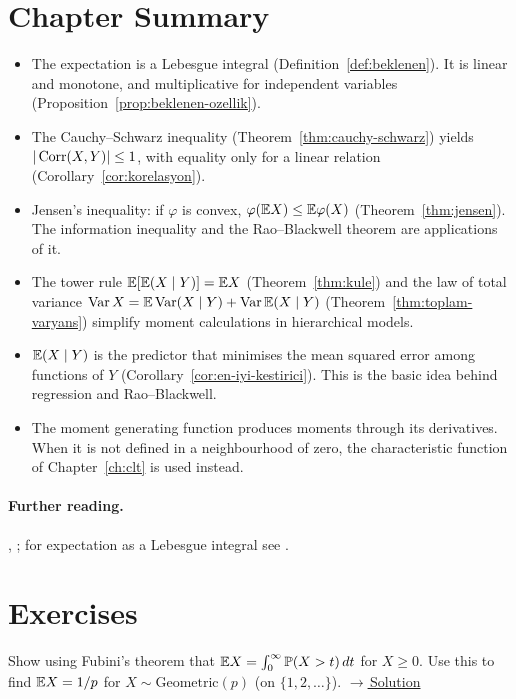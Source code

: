 \documentclass[main.tex]{subfiles}
\begin{document}
\section{Chapter Summary}
\begin{summary}
\begin{itemize}
  \item The expectation is a Lebesgue integral (Definition~\ref{def:beklenen}). It is linear and monotone, and multiplicative for independent variables (Proposition~\ref{prop:beklenen-ozellik}).
  \item The Cauchy--Schwarz inequality (Theorem~\ref{thm:cauchy-schwarz}) yields $|\operatorname{Corr}(X,Y)|\le1$, with equality only for a linear relation (Corollary~\ref{cor:korelasyon}).
  \item Jensen's inequality: if $\varphi$ is convex, $\varphi(\mathbb{E} X)\le\mathbb{E}\varphi(X)$ (Theorem~\ref{thm:jensen}). The information inequality and the Rao--Blackwell theorem are applications of it.
  \item The tower rule $\mathbb{E}[\mathbb{E}(X\mid Y)]=\mathbb{E} X$ (Theorem~\ref{thm:kule}) and the law of total variance $\operatorname{Var} X=\mathbb{E}\operatorname{Var}(X\mid Y)+\operatorname{Var}\mathbb{E}(X\mid Y)$ (Theorem~\ref{thm:toplam-varyans}) simplify moment calculations in hierarchical models.
  \item $\mathbb{E}(X\mid Y)$ is the predictor that minimises the mean squared error among functions of $Y$ (Corollary~\ref{cor:en-iyi-kestirici}). This is the basic idea behind regression and Rao--Blackwell.
  \item The moment generating function produces moments through its derivatives. When it is not defined in a neighbourhood of zero, the characteristic function of Chapter~\ref{ch:clt} is used instead.
\end{itemize}
\end{summary}

\paragraph{Further reading.} \cite[Chapter~2]{casella}, \cite[Chapter~3]{wasserman}; for expectation as a Lebesgue integral see \cite[Sections~1.5--1.6]{durrett}.

\section{Exercises}

\begin{exercise}\label{exr:03-1}
Show using Fubini's theorem that $\mathbb{E} X=\int_0^\infty\mathbb{P}(X>t)\,dt$ for $X\ge0$. Use this to find $\mathbb{E} X=1/p$ for $X\sim\text{Geometric}(p)$ (on $\{1,2,\dots\}$).
\hfill\hyperref[coz:03-1]{\footnotesize$\rightarrow$\,Solution}
\end{exercise}
\end{document}
